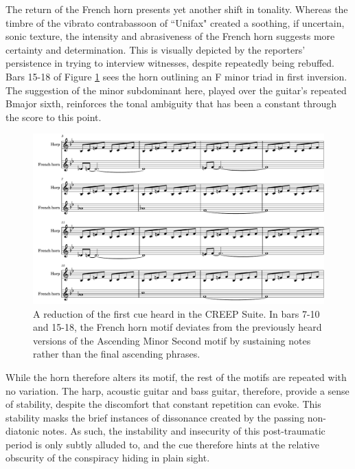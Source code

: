 The return of the French horn presents yet another shift in tonality.
Whereas the timbre of the vibrato contrabassoon of ``Unifax" created a soothing, if uncertain, sonic texture, the intensity and abrasiveness of the French horn suggests more certainty and determination.
This is visually depicted by the reporters' persistence in trying to interview witnesses, despite repeatedly being rebuffed.
Bars 15-18 of Figure \ref{fig:president-creep-I} sees the horn outlining an F minor triad in first inversion.
The suggestion of the minor subdominant here, played over the guitar's repeated B\flat major sixth, reinforces the tonal ambiguity that has been a constant through the score to this point.
\begin{figure}
    \centering
    \includegraphics[width=1\linewidth]{img/president-creep-I.pdf}
    \caption{A reduction of the first cue heard in the CREEP Suite. In bars 7-10 and 15-18, the French horn motif deviates from the previously heard versions of the Ascending Minor Second motif by sustaining notes rather than the final ascending phrases.}
    \label{fig:president-creep-I}
\end{figure}
While the horn therefore alters its motif, the rest of the motifs are repeated with no variation.
The harp, acoustic guitar and bass guitar, therefore, provide a sense of stability, despite the discomfort that constant repetition can evoke.
This stability masks the brief instances of dissonance created by the passing non-diatonic notes.
As such, the instability and insecurity of this post-traumatic period is only subtly alluded to, and the cue therefore hints at the relative obscurity of the conspiracy hiding in plain sight.


